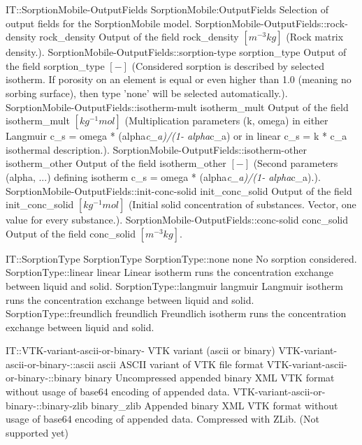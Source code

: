 \begin{SelectionType}
	{IT::SorptionMobile-OutputFields}
	{SorptionMobile:OutputFields}
	{{{Selection of output fields for the SorptionMobile model.}}}
		\SelectionItem
			{SorptionMobile-OutputFields::rock-density}
			{rock{\_}density}
			{{{Output of the field rock{\_}density }{$[m^{-3}kg]$}{ (Rock matrix density.).}}}
		\SelectionItem
			{SorptionMobile-OutputFields::sorption-type}
			{sorption{\_}type}
			{{{Output of the field sorption{\_}type }{$[-]$}{ (Considered sorption is described by selected isotherm. If porosity on an element is equal or even higher than 1.0 (meaning no sorbing surface), then type 'none' will be selected automatically.).}}}
		\SelectionItem
			{SorptionMobile-OutputFields::isotherm-mult}
			{isotherm{\_}mult}
			{{{Output of the field isotherm{\_}mult }{$[kg^{-1}mol]$}{ (Multiplication parameters (k, omega) in either Langmuir c{\_}s = omega * (alpha}\textit{c{\_}a)/(1- alpha}{c{\_}a) or in linear c{\_}s = k * c{\_}a isothermal description.).}}}
		\SelectionItem
			{SorptionMobile-OutputFields::isotherm-other}
			{isotherm{\_}other}
			{{{Output of the field isotherm{\_}other }{$[-]$}{ (Second parameters (alpha, ...) defining isotherm  c{\_}s = omega * (alpha}\textit{c{\_}a)/(1- alpha}{c{\_}a).).}}}
		\SelectionItem
			{SorptionMobile-OutputFields::init-conc-solid}
			{init{\_}conc{\_}solid}
			{{{Output of the field init{\_}conc{\_}solid }{$[kg^{-1}mol]$}{ (Initial solid concentration of substances. Vector, one value for every substance.).}}}
		\SelectionItem
			{SorptionMobile-OutputFields::conc-solid}
			{conc{\_}solid}
			{{{Output of the field conc{\_}solid }{$[m^{-3}kg]$}{.}}}
\end{SelectionType}
\begin{SelectionType}
	{IT::SorptionType}
	{SorptionType}
	{}
		\SelectionItem
			{SorptionType::none}
			{none}
			{{{No sorption considered.}}}
		\SelectionItem
			{SorptionType::linear}
			{linear}
			{{{Linear isotherm runs the concentration exchange between liquid and solid.}}}
		\SelectionItem
			{SorptionType::langmuir}
			{langmuir}
			{{{Langmuir isotherm runs the concentration exchange between liquid and solid.}}}
		\SelectionItem
			{SorptionType::freundlich}
			{freundlich}
			{{{Freundlich isotherm runs the concentration exchange between liquid and solid.}}}
\end{SelectionType}
\begin{SelectionType}
	{IT::VTK-variant-ascii-or-binary-}
	{VTK variant (ascii or binary)}
	{}
		\SelectionItem
			{VTK-variant-ascii-or-binary-::ascii}
			{ascii}
			{{{ASCII variant of VTK file format}}}
		\SelectionItem
			{VTK-variant-ascii-or-binary-::binary}
			{binary}
			{{{Uncompressed appended binary XML VTK format without usage of base64 encoding of appended data.}}}
		\SelectionItem
			{VTK-variant-ascii-or-binary-::binary-zlib}
			{binary{\_}zlib}
			{{{Appended binary XML VTK format without usage of base64 encoding of appended data. Compressed with ZLib. (Not supported yet)}}}
\end{SelectionType}
